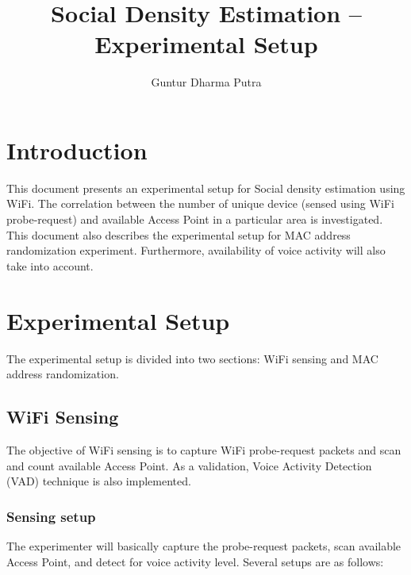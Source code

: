 \documentclass{article}
\begin{document}
\title{Social Density Estimation -- Experimental Setup}
\author{Guntur Dharma Putra}

\maketitle



\section{Introduction} %
\label{sec:introduction}
This document presents an experimental setup for Social density estimation using WiFi. The correlation between the number of unique device (sensed using WiFi probe-request) and available Access Point in a particular area is investigated. This document also describes the experimental setup for MAC address randomization experiment. Furthermore, availability of voice activity will also take into account.

\section{Experimental Setup} %
\label{sec:experimental_setup}
The experimental setup is divided into two sections: WiFi sensing and MAC address randomization.

\subsection{WiFi Sensing} %
\label{sub:wifi_sensing}
The objective of WiFi sensing is to capture WiFi probe-request packets and scan and count available Access Point. As a validation, Voice Activity Detection (VAD) technique is also implemented.

\subsubsection*{Sensing setup} %
The experimenter will basically capture the probe-request packets, scan available Access Point, and detect for voice activity level. Several setups are as follows:
\end{document}
